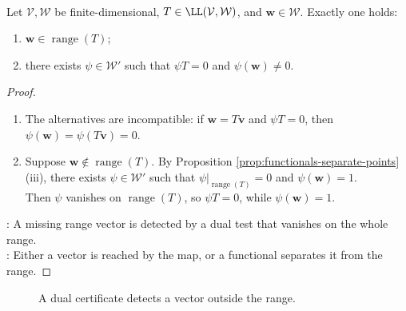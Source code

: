 \begin{theorem} \label{thm:range-membership-dual-alternative} \\
Let $\mathcal{V},\mathcal{W}$ be finite-dimensional, $T\in\LL(\mathcal{V},\mathcal{W})$, and $\mathbf{w}\in\mathcal{W}$. Exactly one holds:
\begin{enumerate}[label=(\roman*)]
\setlength{\itemsep}{0pt}
\item $\mathbf{w}\in\operatorname{range}(T)$;
\item there exists $\psi\in\mathcal{W}'$ such that $\psi T=0$ and $\psi(\mathbf{w})\neq0$.
\end{enumerate}
\begin{proof}
\begin{enumerate}[label=(\roman*)]
\setlength{\itemsep}{0pt}
\item The alternatives are incompatible: if $\mathbf{w}=T\mathbf{v}$ and $\psi T=0$, then $\psi(\mathbf{w})=\psi(T\mathbf{v})=0$.
\item Suppose $\mathbf{w}\notin\operatorname{range}(T)$. By Proposition \ref{prop:functionals-separate-points}(iii), there exists $\psi\in\mathcal{W}'$ such that $\psi|_{\operatorname{range}(T)}=0$ and $\psi(\mathbf{w})=1$.\\
Then $\psi$ vanishes on $\operatorname{range}(T)$, so $\psi T=0$, while $\psi(\mathbf{w})=1$.
\end{enumerate}
: A missing range vector is detected by a dual test that vanishes on the whole range.\\
: Either a vector is reached by the map, or a functional separates it from the range.
\end{proof}
\end{theorem}

\begin{figure}[H]
  \centering
  
  \caption{A dual certificate detects a vector outside the range.}
  \label{fig:range-membership-dual-certificate}
\end{figure}


